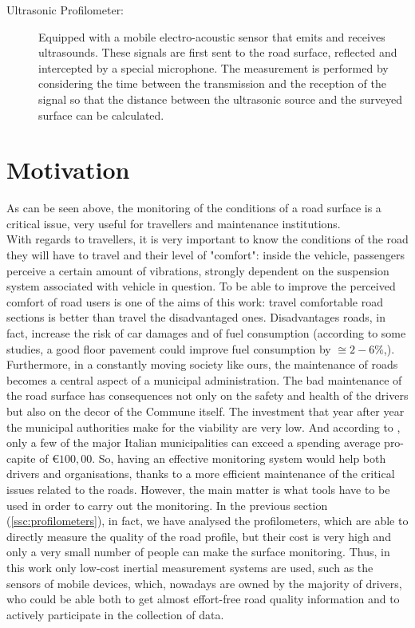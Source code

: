 \documentclass[tesi]{subfiles}
\begin{document}
\begin{enumerate}
\begin{description}
\item [Ultrasonic Profilometer:] Equipped with a mobile electro-acoustic sensor that emits and receives ultrasounds. These signals are first sent to the road surface, reflected and intercepted by a special microphone. The measurement is performed by considering the time between the transmission and the reception of the signal so that the distance between the ultrasonic source and the surveyed surface can be calculated\cite{little_book}.
\end{description}

\end{enumerate}
\clearpage
	\section{Motivation}\label{sc:Motivation}
As can be seen above, the monitoring of the conditions of a road surface is a critical issue, very useful for travellers and maintenance institutions.\\
With regards to travellers, it is very important to know the conditions of the road they will have to travel and their level of "comfort": inside the vehicle, passengers perceive a certain amount of vibrations, strongly dependent on the suspension system associated with vehicle in question.
To be able to improve the perceived comfort of road users is one of the aims of this work: travel comfortable road sections is better than travel the disadvantaged ones. Disadvantages roads, in fact, increase the risk of car damages and of fuel consumption (according to some studies, a good floor pavement could improve fuel consumption by $\displaystyle{\cong{2-6\%}}$\cite{jackson2011synthesis},\cite{jointeapa}).
Furthermore, in a constantly moving society like ours, the maintenance of roads becomes a central aspect of a municipal administration. The bad maintenance of the road surface has consequences not only on the safety and health of the drivers but also on the decor of the Commune itself. 
The investment that year after year the municipal authorities make for the viability are very low. And according to \cite{piemonte2013finanza}, only a few of the major Italian municipalities can exceed a spending average pro-capite of $\displaystyle{\euro 100,00}$.
So, having an effective monitoring system would help both drivers and organisations, thanks to a more efficient maintenance of the critical issues related to the roads.
However, the main matter is what tools have to be used in order to carry out the monitoring. In the previous section (\ref{ssc:profilometers}), in fact, we have analysed the profilometers, which are able to directly measure the quality of the road profile, but their cost is very high and only a very small number of people can make the surface monitoring. 
Thus, in this work only low-cost inertial measurement systems are used, such as the sensors of mobile devices, which, nowadays are owned by the majority of drivers, who could be able both to get almost effort-free road quality information and to actively participate in the collection of data.
\end{document}
